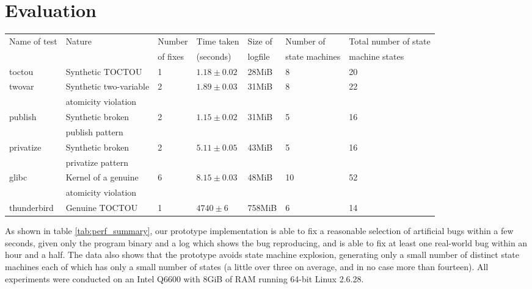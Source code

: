 \documentclass[10pt,twocolumn,preprint,natbib,authoryear]{sigplanconf}
\begin{document}
\section{Evaluation}
\label{sect:evaluation}

\begin{table*}
\begin{tabular}{lllllll}
Name of test & Nature & Number & Time taken & Size of & Number of & Total number of state\\
 & & of fixes & (seconds) & logfile & state machines & machine states\\
\hline
toctou & Synthetic TOCTOU & 1 & $1.18 \pm 0.02$ & 28MiB & 8 & 20\\
twovar & Synthetic two-variable & 2 & $1.89 \pm 0.03$ & 31MiB & 8 & 22\\
       & atomicity violation &&&\\
publish & Synthetic broken & 2 & $1.15 \pm 0.02$ & 31MiB & 5 & 16 \\
        & publish pattern & & & \\
privatize & Synthetic broken & 2 & $5.11 \pm 0.05$ & 43MiB & 5 & 16 \\
          & privatize pattern & & & \\
\hline
glibc & Kernel of a genuine & 6 & $8.15 \pm 0.03$ & 48MiB & 10 & 52\\
      & atomicity violation & & & \\
\hline
thunderbird & Genuine TOCTOU & 1 & $4740 \pm 6$ & 758MiB & 6 & 14
\end{tabular}
\caption{Summary of results obtained from running the fix generating
  tool on a single log file collected from each bug.  The ``Time taken''
  column gives the mean and standard deviation from five runs.}
\label{tab:perf_summary}
\end{table*}

As shown in table \ref{tab:perf_summary}, our prototype implementation
is able to fix a reasonable selection of artificial bugs within a few
seconds, given only the program binary and a log which shows the bug
reproducing, and is able to fix at least one real-world bug within an
hour and a half.  The data also shows that the prototype avoids state
machine explosion, generating only a small number of distinct state
machines each of which has only a small number of states (a little
over three on average, and in no case more than fourteen).  All
experiments were conducted on an Intel Q6600 with 8GiB of RAM running
64-bit Linux 2.6.28.
\end{document}
